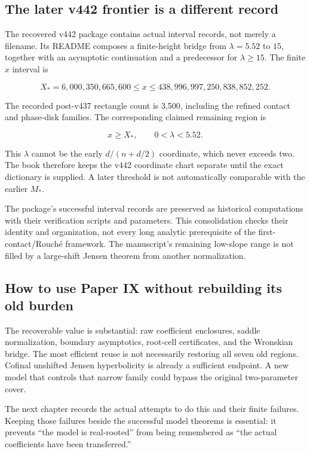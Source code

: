 \documentclass[
  10pt,
  a4paper,
  10pt,
  oneside,
  openany]{book}
\begin{document}
\subsection{The later v442 frontier is a different
record}\label{the-later-v442-frontier-is-a-different-record}

The recovered v442 package contains actual interval records, not merely
a filename. Its README composes a finite-height bridge from
\(\lambda=5.52\) to \(15\), together with an asymptotic continuation and
a predecessor for \(\lambda\ge15\). The finite \(x\) interval is

\[
 X_*=6{,}000{,}350{,}665{,}600
 \le x\le438{,}996{,}997{,}250{,}838{,}852{,}252.
\]

The recorded post-v437 rectangle count is 3,500, including the refined
contact and phase-disk families. The corresponding claimed remaining
region is

\[
 x\ge X_*,\qquad0<\lambda<5.52.
 \tag{31.4}\label{eq:31.4}
\]

This \(\lambda\) cannot be the early \(d/(n+d/2)\) coordinate, which
never exceeds two. The book therefore keeps the v442 coordinate chart
separate until the exact dictionary is supplied. A later threshold is
not automatically comparable with the earlier \(M_*\).

The package's successful interval records are preserved as historical
computations with their verification scripts and parameters. This
consolidation checks their identity and organization, not every long
analytic prerequisite of the first-contact/Rouché framework. The
manuscript's remaining low-slope range is not filled by a large-shift
Jensen theorem from another normalization.

\subsection{How to use Paper IX without rebuilding its old
burden}\label{how-to-use-paper-ix-without-rebuilding-its-old-burden}

The recoverable value is substantial: raw coefficient enclosures, saddle
normalization, boundary asymptotics, root-cell certificates, and the
Wronskian bridge. The most efficient reuse is not necessarily restoring
all seven old regions. Cofinal unshifted Jensen hyperbolicity is already
a sufficient endpoint. A new model that controls that narrow family
could bypass the original two-parameter cover.

The next chapter records the actual attempts to do this and their finite
failures. Keeping those failures beside the successful model theorems is
essential: it prevents ``the model is real-rooted'' from being
remembered as ``the actual coefficients have been transferred.''
\end{document}
